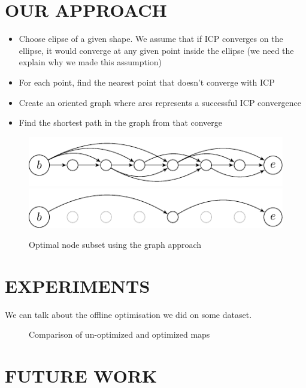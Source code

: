 \documentclass[letterpaper,10 pt,conference]{ieeeconf}
\begin{document}
\section{OUR APPROACH}
\begin{itemize}
  \item Choose elipse of a given shape. We assume that if ICP converges on the
    ellipse, it would converge at any given point inside the ellipse (we need the explain why we made this assumption)

  \item For each point, find the nearest point that doesn't converge with ICP

  \item Create an oriented graph where arcs represents a successful ICP convergence

  \item Find the shortest path in the graph from that converge

\end{itemize}

\begin{figure}[thpb]
  \centering
  \includegraphics[scale=1.0]{img/unoptimized-graph.pdf}
  \includegraphics[scale=1.0]{img/optimized-graph.pdf}
  \caption{Optimal node subset using the graph approach}
\end{figure}


\section{EXPERIMENTS}
We can talk about the offline optimisation we did on some dataset.

\begin{figure}
  \caption{Comparison of un-optimized and optimized maps}
\end{figure}


\section{FUTURE WORK}
\end{document}
